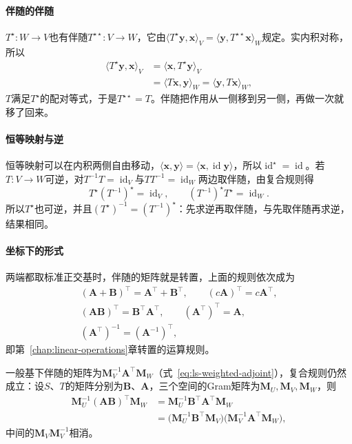 \paragraph{伴随的伴随}
$T^\star:W\to V$也有伴随$T^{\star\star}:V\to W$，它由$\langle T^\star\bm y,\bm x\rangle_V=\langle\bm y,T^{\star\star}\bm x\rangle_W$规定。实内积对称，所以
\[
 \begin{aligned}
 \langle T^\star\bm y,\bm x\rangle_V
 &=\langle\bm x,T^\star\bm y\rangle_V\\
 &=\langle T\bm x,\bm y\rangle_W=\langle\bm y,T\bm x\rangle_W,
 \end{aligned}
\]
$T$满足$T^\star$的配对等式，于是$T^{\star\star}=T$。伴随把作用从一侧移到另一侧，再做一次就移了回来。

\paragraph{恒等映射与逆}
恒等映射可以在内积两侧自由移动，$\langle\bm x,\bm y\rangle=\langle\bm x,\operatorname{id}\bm y\rangle$，所以$\operatorname{id}^\star=\operatorname{id}$。若$T:V\to W$可逆，对$T^{-1}T=\operatorname{id}_V$与$TT^{-1}=\operatorname{id}_W$两边取伴随，由复合规则得
\[
 T^\star(T^{-1})^\star=\operatorname{id}_V,\qquad (T^{-1})^\star T^\star=\operatorname{id}_W .
\]
所以$T^\star$也可逆，并且$(T^\star)^{-1}=(T^{-1})^\star$：先求逆再取伴随，与先取伴随再求逆，结果相同。

\paragraph{坐标下的形式}
两端都取标准正交基时，伴随的矩阵就是转置，上面的规则依次成为
\[
 \begin{gathered}
 (\bm A+\bm B)^\top=\bm A^\top+\bm B^\top,\qquad (c\bm A)^\top=c\bm A^\top,\\
 (\bm A\bm B)^\top=\bm B^\top\bm A^\top,\qquad (\bm A^\top)^\top=\bm A,\\
 (\bm A^\top)^{-1}=(\bm A^{-1})^\top,
 \end{gathered}
\]
即第~\ref{chap:linear-operations}章转置的运算规则。

一般基下伴随的矩阵为$\bm M_V^{-1}\bm A^\top\bm M_W$（式~\eqref{eq:ls-weighted-adjoint}），复合规则仍然成立：设$S$、$T$的矩阵分别为$\bm B$、$\bm A$，三个空间的Gram矩阵为$\bm M_U,\bm M_V,\bm M_W$，则
\[
 \begin{aligned}
 \bm M_U^{-1}(\bm A\bm B)^\top\bm M_W
 &=\bm M_U^{-1}\bm B^\top\bm A^\top\bm M_W\\
 &=\bigl(\bm M_U^{-1}\bm B^\top\bm M_V\bigr)\bigl(\bm M_V^{-1}\bm A^\top\bm M_W\bigr),
 \end{aligned}
\]
中间的$\bm M_V\bm M_V^{-1}$相消。

